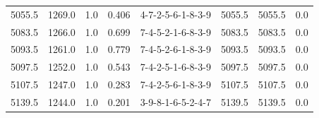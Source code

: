 \begin{tabular}{rrrrlrrr}
 5055.5 &  1269.0 &            1.0 &              0.406 &  4-7-2-5-6-1-8-3-9 &        5055.5 &          5055.5 &       0.0 \\
 5083.5 &  1266.0 &            1.0 &              0.699 &  7-4-5-2-1-6-8-3-9 &        5083.5 &          5083.5 &       0.0 \\
 5093.5 &  1261.0 &            1.0 &              0.779 &  7-4-5-2-6-1-8-3-9 &        5093.5 &          5093.5 &       0.0 \\
 5097.5 &  1252.0 &            1.0 &              0.543 &  7-4-2-5-1-6-8-3-9 &        5097.5 &          5097.5 &       0.0 \\
 5107.5 &  1247.0 &            1.0 &              0.283 &  7-4-2-5-6-1-8-3-9 &        5107.5 &          5107.5 &       0.0 \\
 5139.5 &  1244.0 &            1.0 &              0.201 &  3-9-8-1-6-5-2-4-7 &        5139.5 &          5139.5 &       0.0 \\
\bottomrule
\end{tabular}
